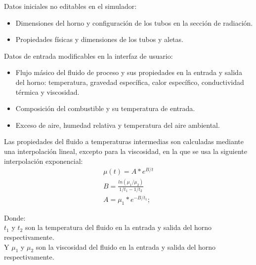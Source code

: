 \par Datos iniciales no editables en el simulador:
\begin{itemize}
    \item Dimensiones del horno y configuración de los tubos en la sección de radiación.
    \item Propiedades físicas y dimensiones de los tubos y aletas.
\end{itemize}
\par Datos de entrada modificables en la interfaz de usuario:
\begin{itemize}
    \item Flujo másico del fluido de proceso y sus propiedades en la entrada y salida del horno: temperatura, gravedad específica, calor específico, conductividad térmica y viscosidad.
    \item Composición del combustible y su temperatura de entrada.
    \item Exceso de aire, humedad relativa y temperatura del aire ambiental.
\end{itemize}
\par Las propiedades del fluido a temperaturas intermedias son calculadas mediante una interpolación lineal, excepto para la viscosidad, en la que se usa la siguiente interpolación exponencial:
\begin{equation}
\begin{gathered}
    \mu(t) = A * e^{B/t} \\
    B = \frac{ln(\mu_1/\mu_2)}{1/t_1 - 1/t_2} \\
    A = \mu_1 * e^{-B/t_1};
\end{gathered}
\end{equation}
\par Donde:\\
$t_1$ y $t_2$ son la temperatura del fluido en la entrada y salida del horno respectivamente.\\
Y $\mu_1$ y $\mu_2$ son la viscosidad del fluido en la entrada y salida del horno respectivamente.
